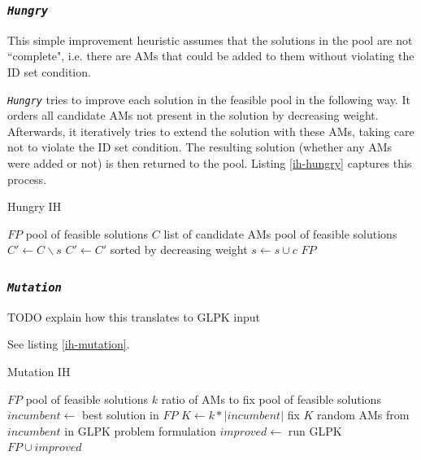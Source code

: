 \documentclass[a4paper,12pt,oneside]{report}
\newcommand{\heu}[1]{\texttt{\textit{#1}}}
\newcommand{\jmodule}[1]{\texttt{\textit{#1}}}
\theoremstyle{definition}
\begin{document}
\subsubsection{\jmodule{Hungry}}

This simple improvement heuristic assumes that the solutions in the pool are not ``complete", i.e. there are AMs that could be added to them without violating the ID set condition.

\heu{Hungry} tries to improve each solution in the feasible pool in the following way. It orders all candidate AMs not present in the solution by decreasing weight. Afterwards, it iteratively tries to extend the solution with these AMs, taking care not to violate the ID set condition. The resulting solution (whether any AMs were added or not) is then returned to the pool. Listing \ref{ih-hungry} captures this process.

\begin{algorithm}
\caption{Hungry IH}
\label{ih-hungry}
\begin{algorithmic}
\REQUIRE $FP$ pool of feasible solutions
\REQUIRE $C$ list of candidate AMs
\ENSURE pool of feasible solutions
  \STATE {}
  \STATE $C' \gets C \backslash s$
  \STATE $C' \gets C'$ sorted by decreasing weight
      \STATE $s \gets s \cup c$
    \ENDIF
  \ENDFOR
\ENDFOR
\RETURN $FP$
\end{algorithmic}
\end{algorithm}

\subsubsection{\jmodule{Mutation}}

TODO explain how this translates to GLPK input

See listing \ref{ih-mutation}.

\begin{algorithm}
\caption{Mutation IH}
\label{ih-mutation}
\begin{algorithmic}
\REQUIRE $FP$ pool of feasible solutions
\REQUIRE $k$ ratio of AMs to fix
\ENSURE pool of feasible solutions
\STATE $incumbent \gets $ best solution in $FP$ 
\STATE $K \gets k * |incumbent|$
\STATE fix $K$ random AMs from $incumbent$ in GLPK problem formulation
\STATE $improved \gets $ run GLPK
\RETURN $FP \cup improved$
\end{algorithmic}
\end{algorithm}
\end{document}
